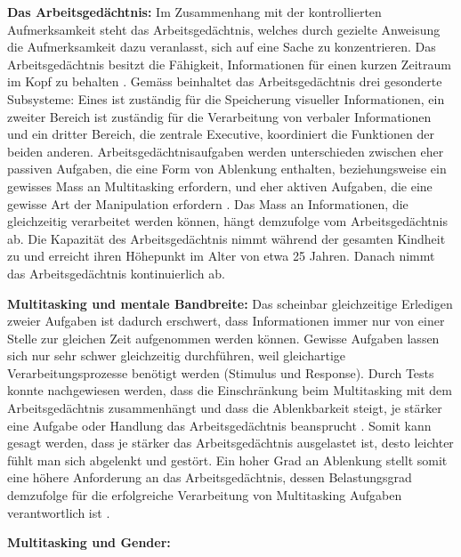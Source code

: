 \par
\textbf{Das Arbeitsgedächtnis:} Im Zusammenhang mit der kontrollierten Aufmerksamkeit steht das Arbeitsgedächtnis, welches durch gezielte Anweisung die Aufmerksamkeit dazu veranlasst, sich auf eine Sache zu konzentrieren. Das Arbeitsgedächtnis besitzt die Fähigkeit, Informationen für einen kurzen Zeitraum im Kopf zu behalten \cite{Klingberg2008}. Gemäss  beinhaltet das Arbeitsgedächtnis drei gesonderte Subsysteme: Eines ist zuständig für die Speicherung visueller Informationen, ein zweiter Bereich ist zuständig für die Verarbeitung von verbaler Informationen und ein dritter Bereich, die zentrale Executive, koordiniert die Funktionen der beiden anderen. Arbeitsgedächtnisaufgaben werden unterschieden zwischen eher passiven Aufgaben, die eine Form von Ablenkung enthalten, beziehungsweise ein gewisses Mass an Multitasking erfordern, und eher aktiven Aufgaben, die eine gewisse Art der Manipulation erfordern \cite{Klingberg2008}. Das Mass an Informationen, die gleichzeitig verarbeitet werden können, hängt demzufolge vom Arbeitsgedächtnis ab. Die Kapazität des Arbeitsgedächtnis nimmt während der gesamten Kindheit zu und erreicht ihren Höhepunkt im Alter von etwa 25 Jahren. Danach nimmt das Arbeitsgedächtnis kontinuierlich ab\cite{Swanson1999}.
\par  
\textbf{Multitasking und mentale Bandbreite:} Das scheinbar gleichzeitige Erledigen zweier Aufgaben ist dadurch erschwert, dass Informationen immer nur von einer Stelle zur gleichen Zeit aufgenommen werden können. Gewisse Aufgaben lassen sich nur sehr schwer gleichzeitig durchführen, weil gleichartige Verarbeitungsprozesse  benötigt werden (Stimulus und Response)\cite{Klingberg2008}. Durch Tests konnte nachgewiesen werden, dass die Einschränkung beim Multitasking mit dem Arbeitsgedächtnis zusammenhängt und dass die Ablenkbarkeit steigt, je stärker eine Aufgabe oder Handlung das Arbeitsgedächtnis beansprucht \cite{Lavie2005}. Somit kann gesagt werden, dass je stärker das Arbeitsgedächtnis ausgelastet ist, desto leichter fühlt man sich abgelenkt und gestört. Ein hoher Grad an Ablenkung stellt somit eine höhere Anforderung an das Arbeitsgedächtnis, dessen Belastungsgrad demzufolge für die erfolgreiche Verarbeitung von Multitasking Aufgaben verantwortlich ist \cite{Klingberg2008}.
\par
\textbf{Multitasking und Gender:}
